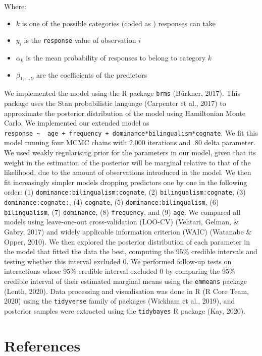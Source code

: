 \documentclass[
  english,
  man,man,floatsintext]{apa6}
\providecommand{\tightlist}{%
  \setlength{\itemsep}{0pt}\setlength{\parskip}{0pt}}
\begin{document}
Where:

\begin{itemize}
\tightlist
\item
  \(k\) is one of the possible categories (coded as ) responses can take
\item
  \(y_i\) is the \texttt{response} value of observation \(i\)
\item
  \(\alpha_k\) is the mean probability of responses to belong to category \(k\)
\item
  \(\beta_{1, \dots, 9}\) are the coefficients of the predictors
\end{itemize}

We implemented the model using the R package \texttt{brms} (Bürkner, 2017). This package uses the Stan probabilistic language (Carpenter et al., 2017) to approximate the posterior distribution of the model using Hamiltonian Monte Carlo. We implemented our extended model as \texttt{response\ \textasciitilde{}\ \ age\ +\ frequency\ +\ dominance*bilingualism*cognate}. We fit this model running four MCMC chains with 2,000 iterations and .80 delta parameter. We used weakly regularising prior for the parameters in our model, given that its weight in the estimation of the posterior will be marginal relative to that of the likelihood, due to the amount of observations introduced in the model. We then fit increasingly simpler models dropping predictors one by one in the following order: (1) \texttt{dominance:bilingualism:cognate}, (2) \texttt{bilingualism:cognate}, (3) \texttt{dominance:cognate:}, (4) \texttt{cognate}, (5) \texttt{dominance:bilingualism}, (6) \texttt{bilingualism}, (7) \texttt{dominance}, (8) \texttt{frequency}, and (9) \texttt{age}. We compared all models using leave-one-out cross-validation (LOO-CV) (Vehtari, Gelman, \& Gabry, 2017) and widely applicable information criterion (WAIC) (Watanabe \& Opper, 2010). We then explored the posterior distribution of each parameter in the model that fitted the data the best, computing the 95\% credible intervals and testing whether this interval excluded 0. We performed follow-up tests on interactions whose 95\% credible interval excluded 0 by comparing the 95\% credible interval of their estimated marginal means using the \texttt{emmeans} package (Lenth, 2020). Data processing and visualisation was done in R (R Core Team, 2020) using the \texttt{tidyverse} family of packages (Wickham et al., 2019), and posterior samples were extracted using the \texttt{tidybayes} R package (Kay, 2020).

\hypertarget{references}{%
\section{References}\label{references}}
\end{document}
